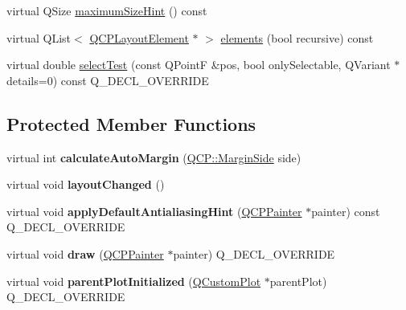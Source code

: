 \begin{DoxyCompactItemize}
\item 
virtual Q\+Size \mbox{\hyperlink{class_q_c_p_layout_element_ab5ce2ba22b36d9a3b70a1be562c326e5}{maximum\+Size\+Hint}} () const
\item 
virtual Q\+List$<$ \mbox{\hyperlink{class_q_c_p_layout_element}{Q\+C\+P\+Layout\+Element}} $\ast$ $>$ \mbox{\hyperlink{class_q_c_p_layout_element_a76dec8cb31e498994a944d7647a43309}{elements}} (bool recursive) const
\item 
virtual double \mbox{\hyperlink{class_q_c_p_layout_element_ae97f483cccedadbf18ea4525ef240ee4}{select\+Test}} (const Q\+PointF \&pos, bool only\+Selectable, Q\+Variant $\ast$details=0) const Q\+\_\+\+D\+E\+C\+L\+\_\+\+O\+V\+E\+R\+R\+I\+DE
\end{DoxyCompactItemize}
\subsection*{Protected Member Functions}
\begin{DoxyCompactItemize}
\item 
\mbox{\label{class_q_c_p_layout_element_a005c9f0fe84bc1591a2cf2c46fd477b4}} 
virtual int {\bfseries calculate\+Auto\+Margin} (\mbox{\hyperlink{namespace_q_c_p_a7e487e3e2ccb62ab7771065bab7cae54}{Q\+C\+P\+::\+Margin\+Side}} side)
\item 
\mbox{\label{class_q_c_p_layout_element_a765f041a73af0c2de41b41a5a03e31a4}} 
virtual void {\bfseries layout\+Changed} ()
\item 
\mbox{\label{class_q_c_p_layout_element_a0a8f18141bcf46cf40ad4c13324ff346}} 
virtual void {\bfseries apply\+Default\+Antialiasing\+Hint} (\mbox{\hyperlink{class_q_c_p_painter}{Q\+C\+P\+Painter}} $\ast$painter) const Q\+\_\+\+D\+E\+C\+L\+\_\+\+O\+V\+E\+R\+R\+I\+DE
\item 
\mbox{\label{class_q_c_p_layout_element_ad1c597b1d608cfdd86e7b76819a94cfb}} 
virtual void {\bfseries draw} (\mbox{\hyperlink{class_q_c_p_painter}{Q\+C\+P\+Painter}} $\ast$painter) Q\+\_\+\+D\+E\+C\+L\+\_\+\+O\+V\+E\+R\+R\+I\+DE
\item 
\mbox{\label{class_q_c_p_layout_element_ab4bb5c5a958451f5f153fdce350f13cf}} 
virtual void {\bfseries parent\+Plot\+Initialized} (\mbox{\hyperlink{class_q_custom_plot}{Q\+Custom\+Plot}} $\ast$parent\+Plot) Q\+\_\+\+D\+E\+C\+L\+\_\+\+O\+V\+E\+R\+R\+I\+DE
\end{DoxyCompactItemize}
